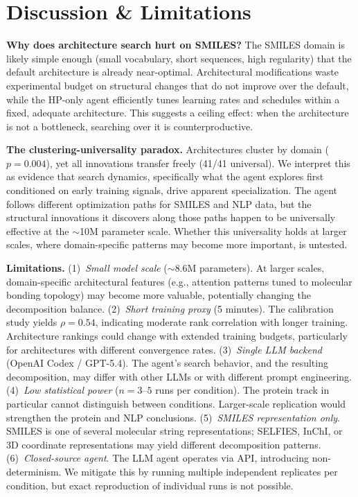 \section{Discussion \& Limitations}
\label{sec:discussion}

\textbf{Why does architecture search hurt on SMILES?}
The SMILES domain is likely simple enough (small vocabulary, short sequences, high regularity) that the default architecture is already near-optimal. Architectural modifications waste experimental budget on structural changes that do not improve over the default, while the HP-only agent efficiently tunes learning rates and schedules within a fixed, adequate architecture. This suggests a ceiling effect: when the architecture is not a bottleneck, searching over it is counterproductive.

\textbf{The clustering-universality paradox.}
Architectures cluster by domain ($p = 0.004$), yet all innovations transfer freely (41/41 universal). We interpret this as evidence that search dynamics, specifically what the agent explores first conditioned on early training signals, drive apparent specialization. The agent follows different optimization paths for SMILES and NLP data, but the structural innovations it discovers along those paths happen to be universally effective at the ${\sim}$10M parameter scale. Whether this universality holds at larger scales, where domain-specific patterns may become more important, is untested.

\textbf{Limitations.}
(1)~\emph{Small model scale} (${\sim}$8.6M parameters). At larger scales, domain-specific architectural features (e.g., attention patterns tuned to molecular bonding topology) may become more valuable, potentially changing the decomposition balance.
(2)~\emph{Short training proxy} (5 minutes). The calibration study yields $\rho = 0.54$, indicating moderate rank correlation with longer training. Architecture rankings could change with extended training budgets, particularly for architectures with different convergence rates.
(3)~\emph{Single LLM backend} (OpenAI Codex / GPT-5.4). The agent's search behavior, and the resulting decomposition, may differ with other LLMs or with different prompt engineering.
(4)~\emph{Low statistical power} ($n = 3$--$5$ runs per condition). The protein track in particular cannot distinguish between conditions. Larger-scale replication would strengthen the protein and NLP conclusions.
(5)~\emph{SMILES representation only}. SMILES is one of several molecular string representations; SELFIES, InChI, or 3D coordinate representations may yield different decomposition patterns.
(6)~\emph{Closed-source agent}. The LLM agent operates via API, introducing non-determinism. We mitigate this by running multiple independent replicates per condition, but exact reproduction of individual runs is not possible.

